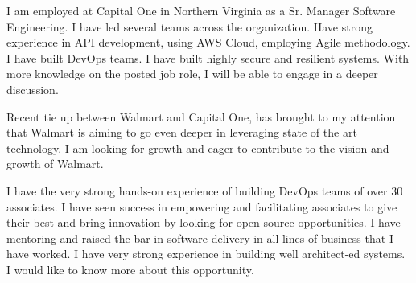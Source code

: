 \documentclass[11pt, a4paper]{awesome-cv}
\begin{document}
\makecvheader

\makelettertitle

\begin{cvletter}
I am employed at Capital One in Northern Virginia as a Sr. Manager Software Engineering. I have led several teams across the organization.  Have strong experience in API development, using AWS Cloud, employing Agile methodology.  I have built DevOps teams. I have built highly secure and resilient systems. With more knowledge on the posted job role, I will be able to engage in a deeper discussion. 

Recent tie up between Walmart and Capital One, has brought to my attention that Walmart is aiming to go even deeper in leveraging state of the art technology.  I am looking for growth and eager to contribute to the vision and growth of Walmart.

I have the very strong hands-on experience of building DevOps teams of over 30 associates.  I have seen success in empowering and facilitating associates to give their best and bring innovation by looking for open source opportunities. I have mentoring and raised the bar in software delivery in all lines of business that I have worked. I have very strong experience in building well architect-ed systems. I would like to know more about this opportunity. 

\end{cvletter}

\makeletterclosing
\end{document}
